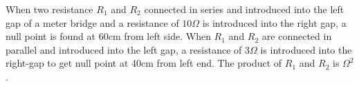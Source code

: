 \item When two resistance \( R_1 \) and \( R_2 \) connected in series and introduced into the left gap of a meter bridge and a resistance of \( 10\Omega \) is introduced into the right gap, a null point is found at 60cm from left side. When \( R_1 \) and \( R_2 \) are connected in parallel and introduced into the left gap, a resistance of \( 3\Omega \) is introduced into the right-gap to get null point at 40cm from left end. The product of \( R_1 \) and \( R_2 \) is \underline{\hspace{2.5cm}} \(\Omega^2\).

\begin{center}
\end{center}